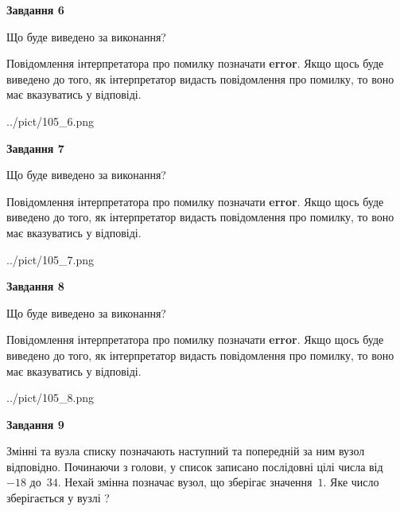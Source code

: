 \documentclass[12pt, ukrainian]{article}
\begin{document}
{\begin {large}
{\begin {center}\textbf{Завдання 6}\end {center}}\par
Що буде виведено за виконання?

Повідомлення інтерпретатора про помилку позначати \textbf{error}.
Якщо щось буде виведено до того, як інтерпретатор видасть повідомлення про помилку, 
то воно має вказуватись у відповіді. \par


\begin{center}
	{../pict/105_6.png}
\end{center}
\newpage

{\begin {center}\textbf{Завдання 7}\end {center}}\par
Що буде виведено за виконання?

Повідомлення інтерпретатора про помилку позначати \textbf{error}.
Якщо щось буде виведено до того, як інтерпретатор видасть повідомлення про помилку, 
то воно має вказуватись у відповіді. \par


\begin{center}
	{../pict/105_7.png}
\end{center}
\newpage

{\begin {center}\textbf{Завдання 8}\end {center}}\par
Що буде виведено за виконання?

Повідомлення інтерпретатора про помилку позначати \textbf{error}.
Якщо щось буде виведено до того, як інтерпретатор видасть повідомлення про помилку, 
то воно має вказуватись у відповіді. \par


\begin{center}
	{../pict/105_8.png}
\end{center}
\newpage

{\begin {center}\textbf{Завдання 9}\end {center}}\par
Змінні  та  вузла списку позначають наступний та попередній за ним вузол відповідно. Починаючи з голови, у список записано послідовні цілі числа від~$-18$ до~$34$. Нехай змінна  позначає вузол, що зберігає значення~$1$.
Яке число зберігається у вузлі  ?\par
\newpage


\end{large}}
\end{document}
